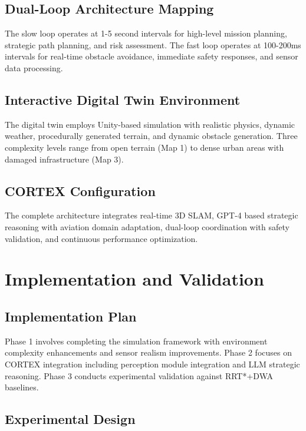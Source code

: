 \subsection{Dual-Loop Architecture Mapping}

The slow loop operates at 1-5 second intervals for high-level mission planning, strategic path planning, and risk assessment. The fast loop operates at 100-200ms intervals for real-time obstacle avoidance, immediate safety responses, and sensor data processing.

\subsection{Interactive Digital Twin Environment}

The digital twin employs Unity-based simulation with realistic physics, dynamic weather, procedurally generated terrain, and dynamic obstacle generation. Three complexity levels range from open terrain (Map 1) to dense urban areas with damaged infrastructure (Map 3).

\subsection{CORTEX Configuration}

The complete architecture integrates real-time 3D SLAM, GPT-4 based strategic reasoning with aviation domain adaptation, dual-loop coordination with safety validation, and continuous performance optimization.

\section{Implementation and Validation}

\subsection{Implementation Plan}

Phase 1 involves completing the simulation framework with environment complexity enhancements and sensor realism improvements. Phase 2 focuses on CORTEX integration including perception module integration and LLM strategic reasoning. Phase 3 conducts experimental validation against RRT*+DWA baselines.

\subsection{Experimental Design}


